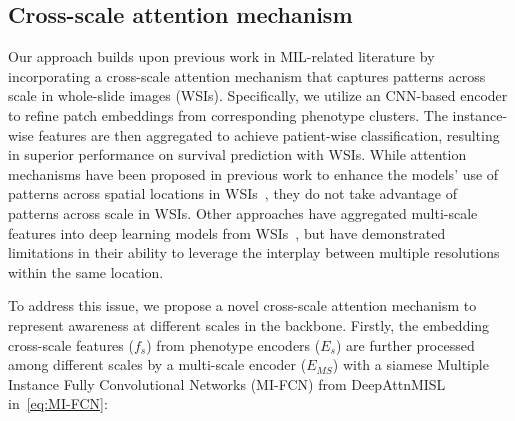 \documentclass[times,twocolumn,final]{elsarticle}
\begin{document}






\subsection{Cross-scale attention mechanism}
Our approach builds upon previous work in MIL-related literature by incorporating a cross-scale attention mechanism that captures patterns across scale in whole-slide images (WSIs). Specifically, we utilize an CNN-based encoder to refine patch embeddings from corresponding phenotype clusters. The instance-wise features are then aggregated to achieve patient-wise classification, resulting in superior performance on survival prediction with WSIs. While attention mechanisms have been proposed in previous work to enhance the models' use of patterns across spatial locations in WSIs~\citep{ilse2018attention, lu2021data}, they do not take advantage of patterns across scale in WSIs. Other approaches have aggregated multi-scale features into deep learning models from WSIs~\citep{Hashimoto_2020_CVPR, Li_2021_CVPR}, but have demonstrated limitations in their ability to leverage the interplay between multiple resolutions within the same location.

To address this issue, we propose a novel cross-scale attention mechanism to represent awareness at different scales in the backbone. Firstly, the embedding cross-scale features ($f_s$) from phenotype encoders ($E_s$) are further processed among different scales by a multi-scale encoder ($E_{MS}$) with a siamese Multiple Instance Fully Convolutional Networks (MI-FCN) from DeepAttnMISL~\citep{yao2020whole} in~\ref{eq:MI-FCN}:
\end{document}
